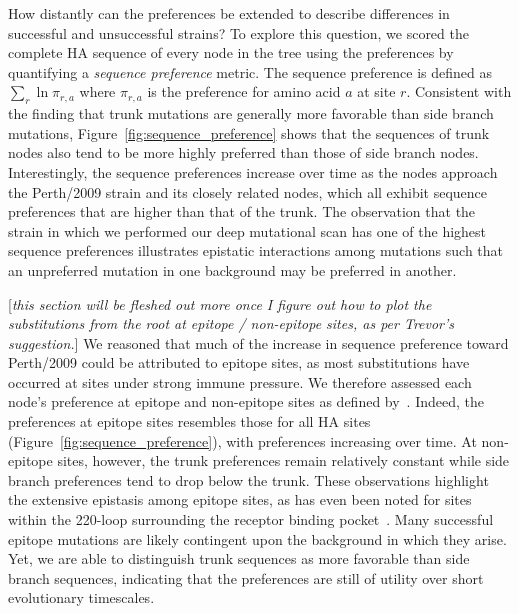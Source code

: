 \documentclass[9pt,twocolumn,twoside]{pnas-new}
\newcommand{\comment}[1]{{\color{red}[\textsl{#1}]}}
\begin{document}
How distantly can the preferences be extended to describe differences in successful and unsuccessful strains?
To explore this question, we scored the complete HA sequence of every node in the tree using the preferences by quantifying a \textit{sequence preference} metric.
The sequence preference is defined as 
$\displaystyle\sum_{r} \ln \pi_{r, a}$
where $\pi_{r, a}$ is the preference for amino acid $a$ at site $r$.
Consistent with the finding that trunk mutations are generally more favorable than side branch mutations, Figure~\ref{fig:sequence_preference} shows that the sequences of trunk nodes also tend to be more highly preferred than those of side branch nodes.
Interestingly, the sequence preferences increase over time as the nodes approach the Perth/2009 strain and its closely related nodes, which all exhibit sequence preferences that are higher than that of the trunk. 
The observation that the strain in which we performed our deep mutational scan has one of the highest sequence preferences illustrates epistatic interactions among mutations such that an unpreferred mutation in one background may be preferred in another.

\comment{this section will be fleshed out more once I figure out how to plot the substitutions from the root at epitope / non-epitope sites, as per Trevor's suggestion.}
We reasoned that much of the increase in sequence preference toward Perth/2009 could be attributed to epitope sites, as most substitutions have occurred at sites under strong immune pressure.
We therefore assessed each node's preference at epitope and non-epitope sites as defined by~\cite{wolf2006long}.
Indeed, the preferences at epitope sites resembles those for all HA sites (Figure~\ref{fig:sequence_preference}), with preferences increasing over time.
At non-epitope sites, however, the trunk preferences remain relatively constant while side branch preferences tend to drop below the trunk.
These observations highlight the extensive epistasis among epitope sites, as has even been noted for sites within the 220-loop surrounding the receptor binding pocket~\citep{wu2017diversity}.
Many successful epitope mutations are likely contingent upon the background in which they arise.
Yet, we are able to distinguish trunk sequences as more favorable than side branch sequences, indicating that the preferences are still of utility over short evolutionary timescales. 
\end{document}
